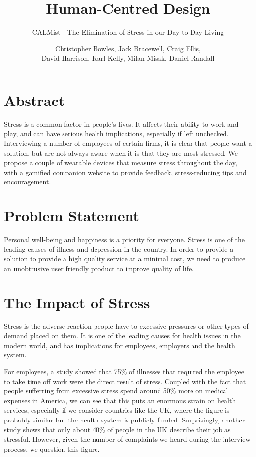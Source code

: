 \documentclass{scrartcl}
\title{Human-Centred Design}
\subtitle{CALMist - The Elimination of Stress in our Day to Day Living}
\author{Christopher Bowles, Jack Bracewell, Craig Ellis,\\David Harrison, Karl Kelly, Milan Misak, Daniel Randall}
\date{}
\begin{document}
\maketitle
\tableofcontents
\clearpage

\section{Abstract}
Stress is a common factor in people's lives. It affects their ability to work and play, and can have serious health
implications, especially if left unchecked. Interviewing a number of employees of certain firms, it is clear that
people want a solution, but are not always aware when it is that they are most stressed. We propose a couple of
wearable devices that measure stress throughout the day, with a gamified companion website to provide feedback,
stress-reducing tips and encouragement.

\section{Problem Statement}
Personal well-being and happiness is a priority for everyone.
Stress is one of the leading causes of illness and depression in the country.
In order to provide a solution to provide a high quality service at a minimal cost,
we need to produce an unobtrusive user friendly product to improve quality of life.

\section{The Impact of Stress}
Stress is the adverse reaction people have to excessive pressures or other types of demand placed on them.
It is one of the leading causes for health issues in the modern world, and has implications for
employees, employers and the health system.

For employees, a study showed that 75\% of illnesses that required the employee to take time off work were
the direct result of stress. Coupled with the fact that people sufferring from excessive stress spend around 50\%
more on medical expenses in America, we can see that this puts an enormous strain on health services, especially
if we consider countries like the UK, where the figure is probably similar but the health system is publicly funded.
Surprisingly, another study shows that only about 40\% of people in the UK describe their job as stressful. However,
given the number of complaints we heard during the interview process, we question this figure.
\end{document}
